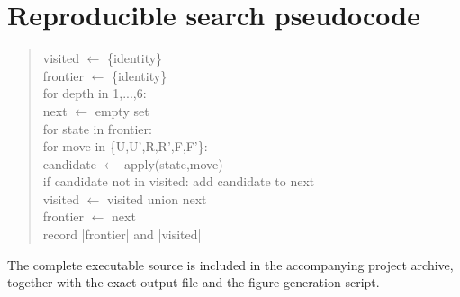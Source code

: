 \documentclass[11pt,a4paper]{article}
\theoremstyle{definition}
\theoremstyle{remark}
\begin{document}
\section{Reproducible search pseudocode}
\begin{quote}\small\ttfamily
visited $\leftarrow$ \{identity\}\\
frontier $\leftarrow$ \{identity\}\\
for depth in 1,...,6:\\
\hspace*{1em} next $\leftarrow$ empty set\\
\hspace*{1em} for state in frontier:\\
\hspace*{2em} for move in \{U,U',R,R',F,F'\}:\\
\hspace*{3em} candidate $\leftarrow$ apply(state,move)\\
\hspace*{3em} if candidate not in visited: add candidate to next\\
\hspace*{1em} visited $\leftarrow$ visited union next\\
\hspace*{1em} frontier $\leftarrow$ next\\
\hspace*{1em} record |frontier| and |visited|
\end{quote}
The complete executable source is included in the accompanying project archive, together with the exact output file and the figure-generation script.

\printbibliography[title={References}]
\end{document}
